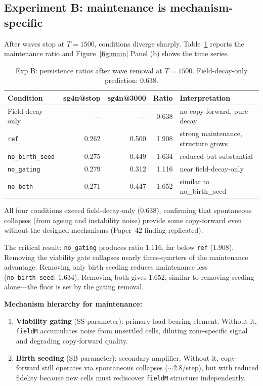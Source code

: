 \documentclass[11pt,a4paper]{article}
\begin{document}
\subsection{Experiment B: maintenance is mechanism-specific}

After waves stop at $T{=}1500$, conditions diverge sharply.  Table~\ref{tab:expb}
reports the maintenance ratio and Figure~\ref{fig:main} Panel (b) shows the time series.

\begin{table}[h]
\centering
\caption{Exp B: persistence ratios after wave removal at $T{=}1500$.
Field-decay-only prediction: $0.638$.}
\label{tab:expb}
\begin{tabular}{lrrrl}
\toprule
\textbf{Condition} & \textbf{sg4n@stop} & \textbf{sg4n@3000} & \textbf{Ratio} & \textbf{Interpretation}\\
\midrule
Field-decay only & ---   & ---   & 0.638 & no copy-forward, pure decay\\
\texttt{ref}           & 0.262 & 0.500 & 1.908 & strong maintenance, structure grows\\
\texttt{no\_birth\_seed} & 0.275 & 0.449 & 1.634 & reduced but substantial\\
\texttt{no\_gating}    & 0.279 & 0.312 & 1.116 & near field-decay-only\\
\texttt{no\_both}      & 0.271 & 0.447 & 1.652 & similar to no\_birth\_seed\\
\bottomrule
\end{tabular}
\end{table}

All four conditions exceed field-decay-only ($0.638$), confirming that
spontaneous collapses (from ageing and instability noise) provide some copy-forward
even without the designed mechanisms (Paper~42 finding replicated).

The critical result: \texttt{no\_gating} produces ratio $1.116$, far below
\texttt{ref} ($1.908$).  Removing the viability gate collapses nearly three-quarters of
the maintenance advantage.  Removing only birth seeding reduces maintenance less
(\texttt{no\_birth\_seed}: $1.634$).  Removing both gives $1.652$, similar to removing
seeding alone---the floor is set by the gating removal.

\textbf{Mechanism hierarchy for maintenance:}
\begin{enumerate}
\item \textbf{Viability gating} (SS parameter): primary load-bearing element.  Without
  it, \texttt{fieldM} accumulates noise from unsettled cells, diluting zone-specific
  signal and degrading copy-forward quality.
\item \textbf{Birth seeding} (SB parameter): secondary amplifier.  Without it,
  copy-forward still operates via spontaneous collapses ($\sim2.8$/step), but with
  reduced fidelity because new cells must rediscover \texttt{fieldM} structure
  independently.
\end{enumerate}
\end{document}

